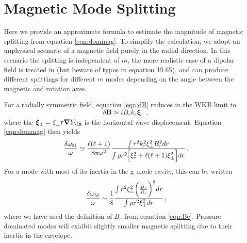 \appendix

\section{Magnetic Mode Splitting}
\label{magmode}

Here we provide an approximate formula to estimate the magnitude of magnetic splitting from equation \ref{eqn:dommag}. To simplify the calculation, we adopt an unphysical scenario of a magnetic field purely in the radial direction. In this scenario the splitting is independent of $m$, the more realistic case of a dipolar field is treated in \cite{Unno_1989} (but beware of typos in equation 19.65), and can produce different splittings for different $m$ modes depending on the angle between the magnetic and rotation axes.

For a radially symmetric field, equation \ref{eqn:dB} reduces in the WKB limit to 
\begin{equation}
\delta {\boldsymbol B} \simeq i B_r k_r \boldsymbol{\xi}_\perp \, ,
\end{equation}
where the $\boldsymbol{\xi}_\perp = \xi_\perp r \boldsymbol{\nabla} Y_{\lm}$ is the horizontal wave displacement. Equation \ref{eqn:dommag} then yields
\begin{equation}
\label{eqn:dommag2}
\frac{\delta \omega_{\rm M}}{\omega} \simeq \frac{\ell(\ell+1)}{8 \pi \omega^2 } \frac{\int r^2 k_r^2 \xi_\perp^2 B_r^2 d r }{\int  \rho r^2 \Big[ \xi_r^2 + \ell(\ell+1) \xi_\perp^2 \Big] d r }\, .
\end{equation}
For a mode with most of its inertia in the g mode cavity, this can be written 
\begin{equation}
\label{eqn:dommag3}
\frac{\delta \omega_{\rm M}}{\omega} \sim \frac{1}{8} \frac{\int r^2 \xi_\perp^2 \bigg(\frac{B_r}{B_c}\bigg)^2 d r }{\int \rho r^2 \xi_\perp^2 d r }\, ,
\end{equation}
where we have used the definition of $B_c$ from equation \ref{eqn:Bc}. Pressure dominated modes will exhibit slightly smaller magnetic splitting due to their inertia in the envelope.

